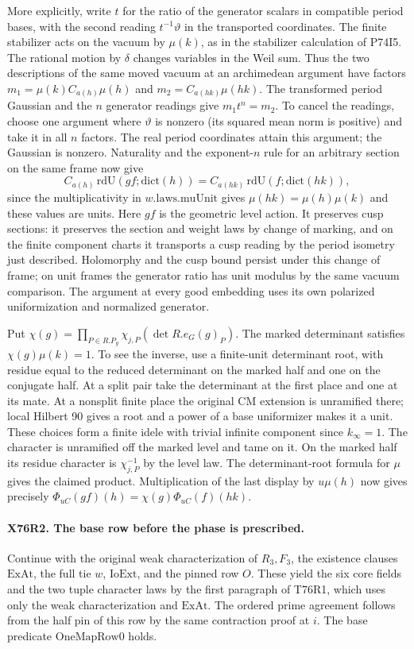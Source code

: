 More explicitly, write $t$ for the ratio of the generator scalars
in compatible period bases, with the second reading
$t^{-1}\vartheta$ in the transported coordinates. The finite
stabilizer acts on the vacuum by $\mu(k)$, as in the stabilizer
calculation of P74I5. The rational motion by $\delta$ changes
variables in the Weil sum. Thus the two descriptions of the
same moved vacuum at an archimedean argument have factors
$m_1=\mu(k)C_{a(h)}\mu(h)$ and $m_2=C_{a(hk)}\mu(hk)$.
The transformed period Gaussian and the $n$ generator readings
give $m_1t^n=m_2$. To cancel the readings, choose one argument
where $\vartheta$ is nonzero (its squared mean norm is positive)
and take it in all $n$ factors. The real period coordinates attain
this argument; the Gaussian is nonzero. Naturality and the
exponent-$n$ rule for an arbitrary section on the same frame now
give
\[
 C_{a(h)}\,\mathrm{rdU}(g f;\mathrm{dict}(h))
       =C_{a(hk)}\,\mathrm{rdU}(f;\mathrm{dict}(hk)),
\]
since the multiplicativity in $w.\mathrm{laws}.\mathrm{muUnit}$ gives
$\mu(hk)=\mu(h)\mu(k)$ and these values are units. Here $gf$ is the
geometric level action. It preserves cusp sections: it preserves
the section and weight laws by change of marking, and on the
finite component charts it transports a cusp reading by the
period isometry just described. Holomorphy and the cusp bound
persist under this change of frame; on unit frames the generator
ratio has unit modulus by the same vacuum comparison. The
argument at every good embedding uses its own polarized
uniformization and normalized generator.

Put $\chi(g)=\prod_{P\in R.P_g}\chi_{j,P}(\det R.e_G(g)_P)$.
The marked determinant satisfies $\chi(g)\mu(k)=1$. To see the
inverse, use a finite-unit determinant root, with residue equal
to the reduced determinant on the marked half and one on the
conjugate half. At a split pair take the determinant at the first
place and one at its mate. At a nonsplit finite place the original
CM extension is unramified there; local Hilbert 90 gives a root
and a power of a base uniformizer makes it a unit. These choices
form a finite idele with trivial infinite component since
$k_\infty=1$. The character is unramified off the marked level
and tame on it. On the marked half its residue character is
$\chi_{j,P}^{-1}$ by the level law. The determinant-root formula
for $\mu$ gives the claimed product. Multiplication of the last
display by $u\mu(h)$ now gives precisely
$\Phi_{uC}(gf)(h)=\chi(g)\Phi_{uC}(f)(hk)$.

\paragraph{X76R2. The base row before the phase is prescribed.}
Continue with the original weak characterization of $R_3,F_3$,
the existence clauses $\mathrm{ExAt}$, the full tie $w$,
$\mathrm{IoExt}$, and the pinned row $O$. These yield the six
core fields and the two tuple character laws by the first
paragraph of T76R1, which uses only the weak characterization
and $\mathrm{ExAt}$. The ordered prime agreement follows from
the half pin of this row by the same contraction proof at $i$.
The base predicate $\mathrm{OneMapRow0}$ holds.

